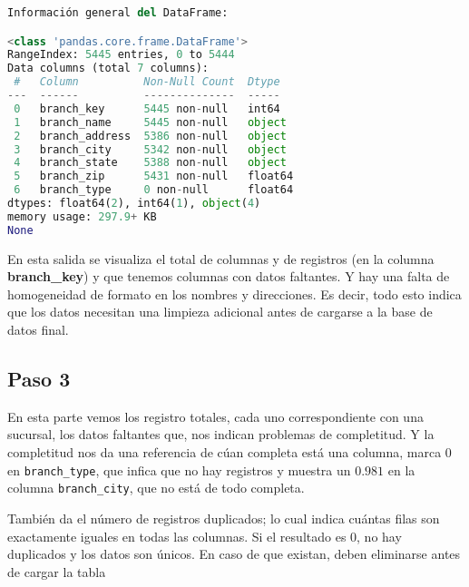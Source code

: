 \begin{lstlisting}[language = Python, caption = {Información de la tabla.}]
Información general del DataFrame:

<class 'pandas.core.frame.DataFrame'>
RangeIndex: 5445 entries, 0 to 5444
Data columns (total 7 columns):
 #   Column          Non-Null Count  Dtype  
---  ------          --------------  -----  
 0   branch_key      5445 non-null   int64  
 1   branch_name     5445 non-null   object 
 2   branch_address  5386 non-null   object 
 3   branch_city     5342 non-null   object 
 4   branch_state    5388 non-null   object 
 5   branch_zip      5431 non-null   float64
 6   branch_type     0 non-null      float64
dtypes: float64(2), int64(1), object(4)
memory usage: 297.9+ KB
None
\end{lstlisting}

\vspace{0.5 cm}

En esta salida se visualiza el total de columnas y de registros 
(en la columna \textbf{branch\_key}) y que tenemos columnas con 
datos faltantes. Y hay una falta de homogeneidad de formato en los nombres 
y direcciones. Es decir, todo esto indica que los datos necesitan una 
limpieza adicional antes de cargarse a la base de datos final. 

\vspace{0.5 cm}

\subsection*{Paso 3}



\vspace{0.5 cm}

En esta parte vemos los registro totales, cada uno correspondiente con una 
sucursal, los datos faltantes que, nos indican problemas de completitud. Y 
la completitud nos da una referencia de cúan completa está una columna, 
marca $0$ en \texttt{branch\_type}, que infica que no hay registros y muestra 
un $0.981$ en la columna \texttt{branch\_city}, que no está de todo completa. 

También da el número de registros duplicados; lo cual indica cuántas filas 
son exactamente iguales en todas las columnas.
Si el resultado es 0, no hay duplicados y los datos son únicos.
En caso de que existan, deben eliminarse antes de cargar la tabla

